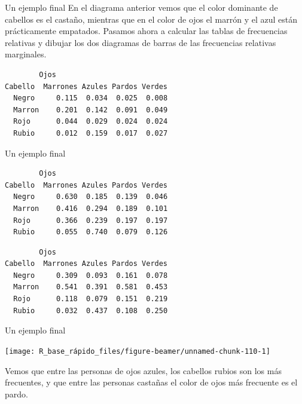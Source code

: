 \documentclass[
  ignorenonframetext,
  aspectratio=169]{beamer}
\begin{document}
\begin{frame}[fragile]{Un ejemplo final}
\label{un-ejemplo-final-6}
En el diagrama anterior vemos que el color dominante de cabellos es el
castaño, mientras que en el color de ojos el marrón y el azul están
prácticamente empatados. Pasamos ahora a calcular las tablas de
frecuencias relativas y dibujar los dos diagramas de barras de las
frecuencias relativas marginales.

\begin{verbatim}
        Ojos
Cabello  Marrones Azules Pardos Verdes
  Negro     0.115  0.034  0.025  0.008
  Marron    0.201  0.142  0.091  0.049
  Rojo      0.044  0.029  0.024  0.024
  Rubio     0.012  0.159  0.017  0.027
\end{verbatim}
\end{frame}

\begin{frame}[fragile]{Un ejemplo final}
\label{un-ejemplo-final-7}
\begin{verbatim}
        Ojos
Cabello  Marrones Azules Pardos Verdes
  Negro     0.630  0.185  0.139  0.046
  Marron    0.416  0.294  0.189  0.101
  Rojo      0.366  0.239  0.197  0.197
  Rubio     0.055  0.740  0.079  0.126
\end{verbatim}

\begin{verbatim}
        Ojos
Cabello  Marrones Azules Pardos Verdes
  Negro     0.309  0.093  0.161  0.078
  Marron    0.541  0.391  0.581  0.453
  Rojo      0.118  0.079  0.151  0.219
  Rubio     0.032  0.437  0.108  0.250
\end{verbatim}
\end{frame}

\begin{frame}{Un ejemplo final}
\label{un-ejemplo-final-8}
\begin{center}\texttt{[image: R\_base\_rápido\_files/figure-beamer/unnamed-chunk-110-1]} \end{center}

Vemos que entre las personas de ojos azules, los cabellos rubios son los
más frecuentes, y que entre las personas castañas el color de ojos más
frecuente es el pardo.
\end{frame}
\end{document}
